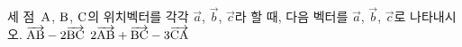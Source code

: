 세 점~$\pt{A}$, $\pt{B}$, $\pt{C}$의 위치벡터를 각각 $\vec{a}$, $\vec{b}$, $\vec{c}$라 할 때, 다음 벡터를 $\vec{a}$, $\vec{b}$, $\vec{c}$로 나타내시오.
 $\vecAB{AB}-2\vecAB{BC}$
 $2\vecAB{AB}+\vecAB{BC}-3\vecAB{CA}$
